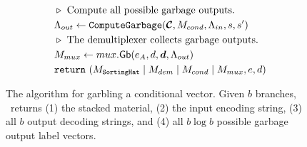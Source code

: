 \begin{figure}[t]
\begin{align*}
    &~~\codecomment{Compute all possible garbage outputs.}\\
    &~~\Lambda_{out} \gets \computegarbage(\vec{\cir}, M_{cond}, \Lambda_{in}, s, s')\\
    &~~\codecomment{The demultiplexer collects garbage outputs.}\\
    &~~\mat_{mux} \gets \gbmux(e_\aid, d, \vec{d}, \Lambda_{out})\\
    &~~\creturn~(\mat_\gadget \mid \mat_{dem} \mid \mat_{cond} \mid \mat_{mux}, e, d)
  \end{align*}
  \caption{%
    The algorithm for garbling a conditional vector.
    Given $b$ branches, \gbcond\ returns (1) the stacked material, (2)
    the input encoding string, (3) all $b$ output decoding strings,
    and (4) all $b\log b$ possible garbage output label vectors.
  }
\end{figure}

